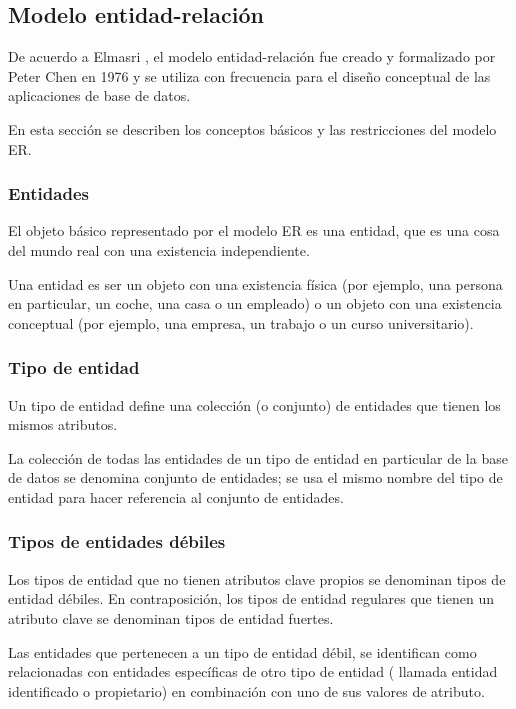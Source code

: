 
\subsection{Modelo entidad-relación}

De acuerdo a Elmasri \cite{ramez_elmasri_fundamentos_nodate}, el modelo entidad-relación fue creado y formalizado por Peter Chen en 1976\cite{chen_entity-relationship_nodate} y se utiliza con frecuencia para el diseño conceptual de las aplicaciones de base de datos. 


En esta sección se describen los conceptos básicos y las restricciones del modelo ER. 

\subsubsection{Entidades}
El objeto básico representado por el modelo ER es una entidad, que es una cosa del mundo real con una existencia independiente.


Una entidad es ser un objeto con una existencia física (por ejemplo, una persona en particular, un coche, una casa o un empleado) o un objeto con una existencia conceptual (por ejemplo, una empresa, un trabajo o un curso universitario).

\subsubsection*{Tipo de entidad}

Un tipo de entidad define una colección (o conjunto) de entidades que tienen los mismos atributos.


La colección de todas las entidades de un tipo de entidad en particular de la base de datos se denomina conjunto de entidades; se usa el mismo nombre del tipo de entidad para hacer referencia al conjunto de entidades. 

\subsubsection*{Tipos de entidades débiles}

Los tipos de entidad que no tienen atributos clave propios se denominan tipos de entidad débiles. En contraposición, los tipos de entidad regulares que tienen un atributo clave se denominan tipos de entidad fuertes.


Las entidades que pertenecen a un tipo de entidad débil, se identifican como relacionadas con entidades específicas de otro tipo de entidad ( llamada entidad identificado o propietario) en combinación con uno de sus valores de atributo.


